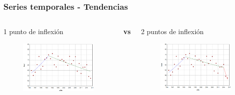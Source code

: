 \documentclass{beamer}
\begin{document}
\begin{frame}\frametitle{Series temporales - Tendencias}
	\begin{columns}
		\begin{column}{0.5\textwidth}
			\centering \normalsize 1 punto de inflexión
			\begin{figure}
				\includegraphics[width=\textwidth]{images/jpo1.png}
			\end{figure}
			
		\end{column}
		\large{\textbf{vs}}
		\begin{column}{0.5\textwidth}
			\centering \normalsize 2 puntos de inflexión
			\begin{figure}
				\centering
				\includegraphics[width=\textwidth]{images/jpo2.png}
			\end{figure}
		\end{column}
	\end{columns}


\end{frame}
\end{document}

